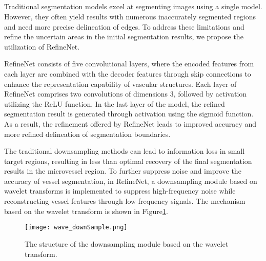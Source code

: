 \documentclass[a4paper,fleqn]{cas-dc}
\begin{document}
\subsection{}
Traditional segmentation models excel at segmenting images using a single model. However, they often yield results with numerous inaccurately segmented regions and need more precise delineation of edges. To address these limitations and refine the uncertain areas in the initial segmentation results, we propose the utilization of RefineNet. 

RefineNet consists of five convolutional layers, where the encoded features from each layer are combined with the decoder features through skip connections to enhance the representation capability of vascular structures. Each layer of RefineNet comprises two convolutions of dimensions 3, followed by activation utilizing the ReLU function. In the last layer of the model, the refined segmentation result is generated through activation using the sigmoid function. As a result, the refinement offered by RefineNet leads to improved accuracy and more refined delineation of segmentation boundaries.

The traditional downsampling methods can lead to information loss in small target regions, resulting in less than optimal recovery of the final segmentation results in the microvessel region. To further suppress noise and improve the accuracy of vessel segmentation, in RefineNet, a downsampling module based on wavelet transforms is implemented to suppress high-frequency noise while reconstructing vessel features through low-frequency signals. The mechanism based on the wavelet transform is shown in Figure\ref{wavelet}.


\begin{figure}[ht!]
	\centering\texttt{[image: wave\_downSample.png]}
	\caption{The structure of the downsampling module based on the wavelet transform.}
	\label{wavelet}
\end{figure}


\end{document}
